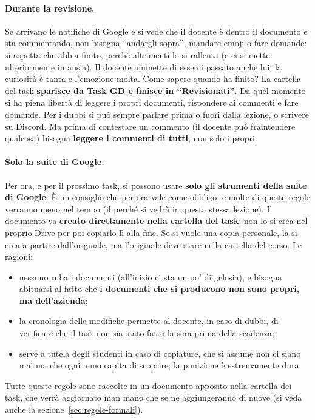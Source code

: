 \paragraph{Durante la revisione.} Se arrivano le notifiche di Google e si vede
che il docente è dentro il documento e sta commentando, non bisogna
``andargli sopra'', mandare emoji o fare domande: si aspetta che abbia finito,
perché altrimenti lo si rallenta (e ci si mette ulteriormente in ansia). Il
docente ammette di esserci passato anche lui: la curiosità è tanta e
l'emozione molta. Come sapere quando ha finito? La cartella del task
\textbf{sparisce da Task GD e finisce in ``Revisionati''}. Da quel momento si
ha piena libertà di leggere i propri documenti, rispondere ai commenti e fare
domande. Per i dubbi si può sempre parlare prima o fuori dalla lezione, o
scrivere su Discord. Ma prima di contestare un commento (il docente può
fraintendere qualcosa) bisogna \textbf{leggere i commenti di tutti}, non solo
i propri.

\paragraph{Solo la suite di Google.} Per ora, e per il prossimo task, si
possono usare \textbf{solo gli strumenti della suite di Google}. È un
consiglio che per ora vale come obbligo, e molte di queste regole verranno
meno nel tempo (il perché si vedrà in questa stessa lezione). Il documento va
\textbf{creato direttamente nella cartella del task}: non lo si crea nel
proprio Drive per poi copiarlo lì alla fine. Se si vuole una copia personale,
la si crea a partire dall'originale, ma l'originale deve stare nella cartella
del corso. Le ragioni:
\begin{itemize}
  \item nessuno ruba i documenti (all'inizio ci sta un po' di gelosia), e
        bisogna abituarsi al fatto che \textbf{i documenti che si producono
        non sono propri, ma dell'azienda};
  \item la cronologia delle modifiche permette al docente, in caso di dubbi,
        di verificare che il task non sia stato fatto la sera prima della
        scadenza;
  \item serve a tutela degli studenti in caso di copiature, che si assume non
        ci siano mai ma che ogni anno capita di scoprire; la punizione è
        estremamente dura.
\end{itemize}
Tutte queste regole sono raccolte in un documento apposito nella cartella
dei task, che verrà aggiornato man mano che se ne aggiungeranno di nuove (si
veda anche la sezione~\ref{sec:regole-formali}).

